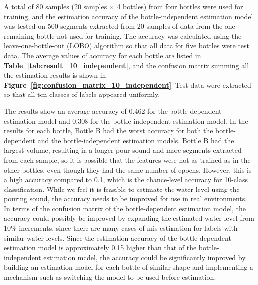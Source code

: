 \documentclass[manuscript,screen,review]{acmart}
\newcommand\figref[1]{\textbf{Figure~\ref{fig:#1}}}
\newcommand\tabref[1]{\textbf{Table~\ref{tab:#1}}}
\begin{document}
A total of 80 samples (20 samples $\times$ 4 bottles) from four bottles were used for training, and the estimation accuracy of the bottle-independent estimation model was tested on 500 segments extracted from 20 samples of data from the one remaining bottle not used for training. The accuracy was calculated using the leave-one-bottle-out (LOBO) algorithm so that all data for five bottles were test data. The average values of accuracy for each bottle are listed in \tabref{result_10_independent}, and the confusion matrix summing all the estimation results is shown in \figref{confusion_matrix_10_independent}. Test data were extracted so that all ten classes of labels appeared uniformly.\par

The results show an average accuracy of 0.462 for the bottle-dependent estimation model and 0.308 for the bottle-independent estimation model. In the results for each bottle, Bottle B had the worst accuracy for both the bottle-dependent and the bottle-independent estimation models. Bottle B had the largest volume, resulting in a longer pour sound and more segments extracted from each sample, so it is possible that the features were not as trained as in the other bottles, even though they had the same number of epochs. However, this is a high accuracy compared to 0.1, which is the chance-level accuracy for 10-class classification. While we feel it is feasible to estimate the water level using the pouring sound, the accuracy needs to be improved for use in real environments. In terms of the confusion matrix of the bottle-dependent estimation model, the accuracy could possibly be improved by expanding the estimated water level from 10\% increments, since there are many cases of mis-estimation for labels with similar water levels. Since the estimation accuracy of the bottle-dependent estimation model is approximately 0.15 higher than that of the bottle-independent estimation model, the accuracy could be significantly improved by building an estimation model for each bottle of similar shape and implementing a mechanism such as switching the model to be used before estimation.
\end{document}
